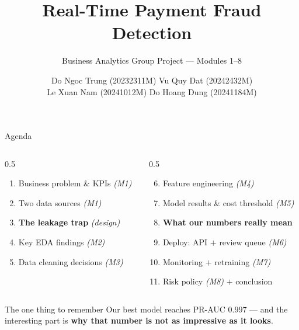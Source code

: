 \documentclass[aspectratio=169]{beamer}
\title[Fraud Detection]{Real-Time Payment Fraud Detection}
\subtitle{Business Analytics Group Project --- Modules 1--8}
\author[Group]{\small Do Ngoc Trung {\footnotesize(20232311M)} \quad Vu Quy Dat {\footnotesize(20242432M)}\\[0.2em]
Le Xuan Nam {\footnotesize(20241012M)} \quad Do Hoang Dung {\footnotesize(20241184M)}}
\institute[]{Supervisor: Ph.D Bui Quoc Trung \\[0.3em] Business Analytics}
\date{}
\newcommand{\warn}[1]{\textcolor{hustdark}{\textbf{#1}}}
\begin{document}
\begin{frame}
\titlepage
\end{frame}

\begin{frame}{Agenda}
\begin{columns}[T]
\begin{column}{0.5\textwidth}
\begin{enumerate}
    \item Business problem \& KPIs \hfill \textit{(M1)}
    \item Two data sources \hfill \textit{(M1)}
    \item \warn{The leakage trap} \hfill \textit{(design)}
    \item Key EDA findings \hfill \textit{(M2)}
    \item Data cleaning decisions \hfill \textit{(M3)}
\end{enumerate}
\end{column}
\begin{column}{0.5\textwidth}
\begin{enumerate}
    \setcounter{enumi}{5}
    \item Feature engineering \hfill \textit{(M4)}
    \item Model results \& cost threshold \hfill \textit{(M5)}
    \item \warn{What our numbers really mean}
    \item Deploy: API $+$ review queue \hfill \textit{(M6)}
    \item Monitoring $+$ retraining \hfill \textit{(M7)}
    \item Risk policy \hfill \textit{(M8)} $+$ conclusion
\end{enumerate}
\end{column}
\end{columns}

\vspace{1em}
\begin{block}{The one thing to remember}
Our best model reaches PR-AUC $0.997$ --- and the interesting part is
\warn{why that number is not as impressive as it looks}.
\end{block}
\end{frame}
\end{document}
